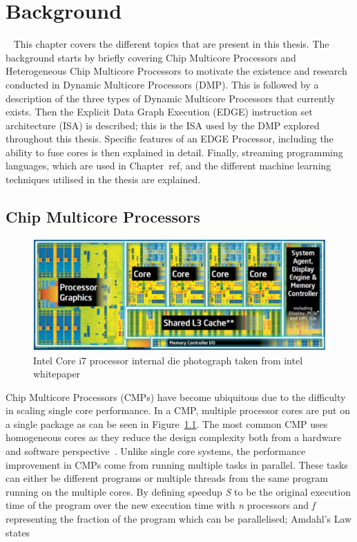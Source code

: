 \chapter{Background}~\label{chp:Background}
This chapter covers the different topics that are present in this thesis.
The background starts by briefly covering Chip Multicore Processors and Heterogeneous Chip Multicore Processors to motivate the existence and research conducted in Dynamic Multicore Processors (DMP).
This is followed by a description of the three types of Dynamic Multicore Processors that currently exists.
Then the Explicit Data Graph Execution (EDGE) instruction set architecture (ISA) is described; this is the ISA used by the DMP explored throughout this thesis.
Specific features of an EDGE Processor, including the ability to fuse cores is then explained in detail.
Finally, streaming programming languages, which are used in Chapter~ref{}, and the different machine learning techniques utilised in the thesis are explained.

\section{Chip Multicore Processors}

\begin{figure}[t]
 \center
 \includegraphics[width=1\textwidth]{background/graphics/i7intel.jpg}
 \caption{Intel Core i7 processor internal die photograph taken from intel whitepaper}\label{fig:i7}
\end{figure}
 
Chip Multicore Processors (CMPs) have become ubiquitous due to the difficulty in scaling single core performance.
In a CMP, multiple processor cores are put on a single package as can be seen in Figure~\ref{fig:i7}.
The most common CMP uses homogeneous cores as they reduce the design complexity both from a hardware and software perspective~\cite{}.
Unlike single core systems, the performance improvement in CMPs come from running multiple tasks in parallel.
These tasks can either be different programs or multiple threads from the same program running on the multiple cores.
By defining speedup \textit{S} to be the original execution time of the program over the new execution time with \textit{n} processors and \textit{f} representing the fraction of the program which can be parallelised; Amdahl's Law states

